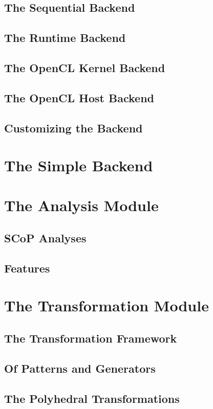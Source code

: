 \subsection{The Sequential Backend}
\subsection{The Runtime Backend}
\subsection{The OpenCL Kernel Backend}
\subsection{The OpenCL Host Backend}
\subsection{Customizing the Backend}

\section{The Simple Backend}

\section{The Analysis Module}
\subsection{SCoP Analyses}
\subsection{Features}

\section{The Transformation Module}
\subsection{The Transformation Framework}
\subsection{Of Patterns and Generators}
\subsection{The Polyhedral Transformations}

